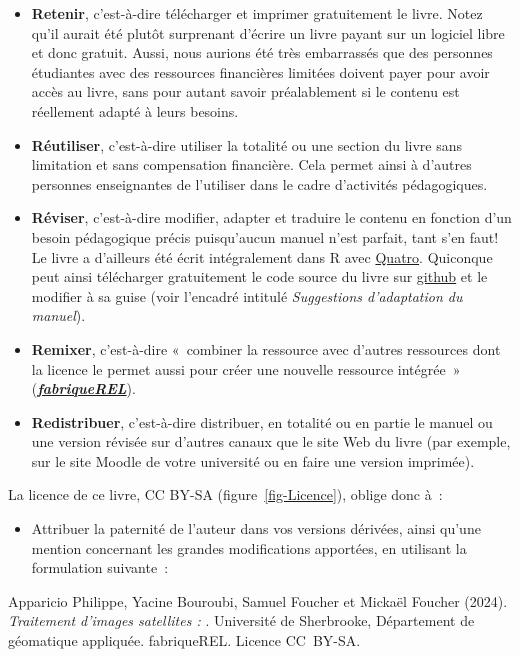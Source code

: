 \documentclass[
  letterpaper,
  DIV=11,
  numbers=noendperiod]{scrreprt}
\providecommand{\tightlist}{%
  \setlength{\itemsep}{0pt}\setlength{\parskip}{0pt}}\usepackage{longtable,booktabs,array}
\begin{document}
\begin{itemize}
\item
  \textbf{Retenir}, c'est-à-dire télécharger et imprimer gratuitement le
  livre. Notez qu'il aurait été plutôt surprenant d'écrire un livre
  payant sur un logiciel libre et donc gratuit. Aussi, nous aurions été
  très embarrassés que des personnes étudiantes avec des ressources
  financières limitées doivent payer pour avoir accès au livre, sans
  pour autant savoir préalablement si le contenu est réellement adapté à
  leurs besoins.
\item
  \textbf{Réutiliser}, c'est-à-dire utiliser la totalité ou une section
  du livre sans limitation et sans compensation financière. Cela permet
  ainsi à d'autres personnes enseignantes de l'utiliser dans le cadre
  d'activités pédagogiques.
\item
  \textbf{Réviser}, c'est-à-dire modifier, adapter et traduire le
  contenu en fonction d'un besoin pédagogique précis puisqu'aucun manuel
  n'est parfait, tant s'en faut! Le livre a d'ailleurs été écrit
  intégralement dans R avec \href{https://quarto.org/}{Quatro}.
  Quiconque peut ainsi télécharger gratuitement le code source du livre
  sur
  \href{https://github.com/SerieBoldR/MethodesAnalyseSpatiale}{github}
  et le modifier à sa guise (voir l'encadré intitulé \emph{Suggestions
  d'adaptation du manuel}).
\item
  \textbf{Remixer}, c'est-à-dire «~combiner la ressource avec d'autres
  ressources dont la licence le permet aussi pour créer une nouvelle
  ressource intégrée~»
  (\href{https://fabriquerel.org/rel/}{\textbf{\emph{fabriqueREL}}}).
\item
  \textbf{Redistribuer}, c'est-à-dire distribuer, en totalité ou en
  partie le manuel ou une version révisée sur d'autres canaux que le
  site Web du livre (par exemple, sur le site Moodle de votre université
  ou en faire une version imprimée).
\end{itemize}

La licence de ce livre, CC BY-SA (figure~\ref{fig-Licence}), oblige donc
à~:

\begin{itemize}
\tightlist
\item
  Attribuer la paternité de l'auteur dans vos versions dérivées, ainsi
  qu'une mention concernant les grandes modifications apportées, en
  utilisant la formulation suivante~:
\end{itemize}

Apparicio Philippe, Yacine Bouroubi, Samuel Foucher et Mickaël Foucher
(2024). \emph{Traitement d'images satellites : }. Université de
Sherbrooke, Département de géomatique appliquée. fabriqueREL. Licence
CC~BY-SA.
\end{document}

